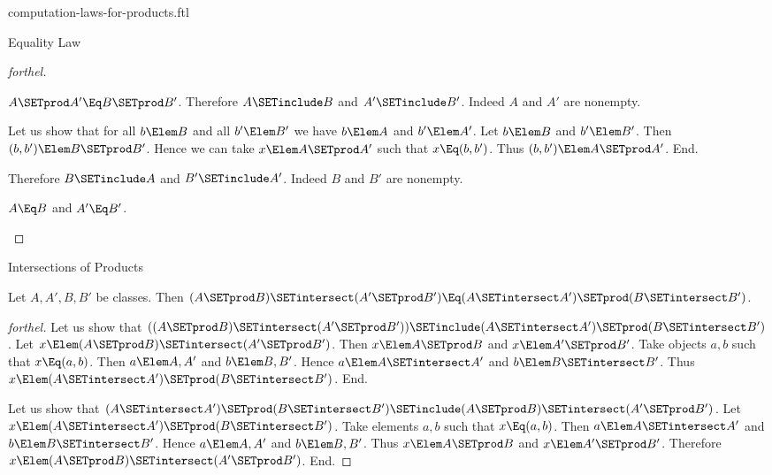 \documentclass{stex}
\begin{document}
\begin{smodule}{computation-laws-for-products.ftl}
\begin{sfragment}{Equality Law}
\begin{proof}[forthel]
\begin{case}{$A \SETprod A' \Eq B \SETprod B'$.}
      Therefore $A \SETinclude B$ and $A' \SETinclude B'$.
      Indeed $A$ and $A'$ are nonempty.

      Let us show that for all $b \Elem B$ and all $b' \Elem B'$ we have $b \Elem A$ and $b' \Elem A'$.
        Let $b \Elem B$ and $b' \Elem B'$.
        Then $(b, b') \Elem B \SETprod B'$.
        Hence we can take $x \Elem A \SETprod A'$ such that $x \Eq (b, b')$.
        Thus $(b, b') \Elem A \SETprod A'$.
      End.

      Therefore $B \SETinclude A$ and $B' \SETinclude A'$.
      Indeed $B$ and $B'$ are nonempty.
    \end{case}

    \begin{case}{$A \Eq B$ and $A' \Eq B'$.} \end{case}
  \end{proof}
\end{sfragment}

\begin{sfragment}{Intersections of Products}
  \begin{proposition}[forthel]
    Let $A, A', B, B'$ be classes.
    Then $(A \SETprod B) \SETintersect (A' \SETprod B') \Eq (A \SETintersect A') \SETprod (B \SETintersect B')$.
  \end{proposition}
  \begin{proof}[forthel]
    Let us show that $((A \SETprod B) \SETintersect (A' \SETprod B')) \SETinclude (A \SETintersect A') \SETprod (B \SETintersect B')$. %
      Let $x \Elem (A \SETprod B) \SETintersect (A' \SETprod B')$.
      Then $x \Elem A \SETprod B$ and $x \Elem A' \SETprod B'$.
      Take objects $a, b$ such that $x \Eq (a, b)$.
      Then $a \Elem A, A'$ and $b \Elem B, B'$.
      Hence $a \Elem A \SETintersect A'$ and $b \Elem B \SETintersect B'$.
      Thus $x \Elem (A \SETintersect A') \SETprod (B \SETintersect B')$.
    End.

    Let us show that $(A \SETintersect A') \SETprod (B \SETintersect B') \SETinclude (A \SETprod B) \SETintersect (A' \SETprod B')$.
      Let $x \Elem (A \SETintersect A') \SETprod (B \SETintersect B')$.
      Take elements $a, b$ such that $x \Eq (a, b)$.
      Then $a \Elem A \SETintersect A'$ and $b \Elem B \SETintersect B'$.
      Hence $a \Elem A, A'$ and $b \Elem B, B'$.
      Thus $x \Elem A \SETprod B$ and $x \Elem A' \SETprod B'$.
      Therefore $x \Elem (A \SETprod B) \SETintersect (A' \SETprod B')$.
    End.
  \end{proof}
\end{sfragment}


\end{smodule}
\end{document}
